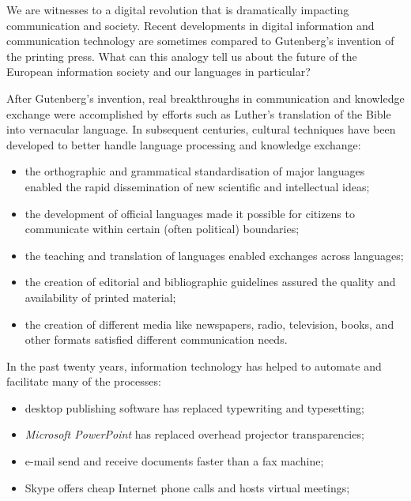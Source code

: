 \begin{multicols}{2}

    We are witnesses to a digital revolution that is dramatically impacting communication and society. Recent developments in digital information and communication technology are sometimes compared to Gutenberg’s invention of the printing press. What can this analogy tell us about the future of the European information society and our languages in particular?


    After Gutenberg’s invention, real breakthroughs in communication and knowledge exchange were accomplished by efforts such as Luther’s translation of the Bible into vernacular language. In subsequent centuries, cultural techniques have been developed to better handle language processing and knowledge exchange:
    \begin{itemize}
      \item the orthographic and grammatical standardisation of major languages enabled the rapid dissemination of new 
      scientific and intellectual ideas;
      \item the development of official languages made it possible for citizens to communicate within certain (often 
      political) boundaries;
      \item the teaching and translation of languages enabled exchanges across languages;
      \item the creation of editorial and bibliographic guidelines assured the quality and availability of printed 
      material;
      \item the creation of different media like newspapers, radio, television, books, and other formats satisfied 
      different communication needs. 
    \end{itemize}
    In the past twenty years, information technology has helped to automate and facilitate many of the processes:
    \begin{itemize}
      \item desktop publishing software has replaced typewriting and typesetting;
      \item \textit{Microsoft PowerPoint} has replaced overhead projector transparencies;
      \item e-mail send and receive documents faster than a fax machine;
      \item Skype offers cheap Internet phone calls and hosts virtual meetings;

\end{itemize}
\end{multicols}
